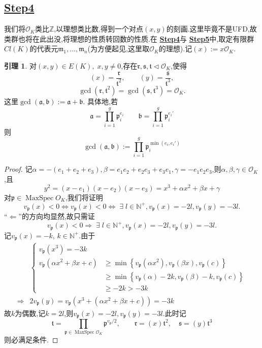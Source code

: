 \documentclass[12pt,A4paper,oneside,reqno]{amsart}
\numberwithin{equation}{section}
\theoremstyle{definition}
\newtheorem{lemma}[theorem]{引理}
\theoremstyle{plain}
\theoremstyle{plain}
\numberwithin{equation}{section}
\theoremstyle{remark}
\newcommand{\MaxSpec}{\operatorname{MaxSpec}}
\begin{document}
\subsection*{\underline{Step4}}
我们将$\mathcal{O}_K$类比$\mathbb{Z}$,以理想类比数,得到一个对点$(x,y)$的刻画.这里毕竟不是UFD,故类群也将在此出没,将理想的性质转回数的性质.在 \textbf{\underline{Step4}}与 \textbf{\underline{Step5}}中,取定有限群$Cl(K)$的代表元$\mathfrak{m}_1,\ldots , \mathfrak{m}_n$(为方便起见,这里取$\mathcal{O}_K$的理想).记$(x):=x \mathcal{O}_K$.
\begin{lemma}\label{lem:value2&3ideal}
	对$(x,y) \in E(K), \;x,y\neq 0$,存在$\mathfrak{r},\mathfrak{s},\mathfrak{t} \vartriangleleft \mathcal{O}_K$,使得
	$$(x)=\frac{\mathfrak{r}}{\mathfrak{t}^2}, \qquad (y)=\frac{\mathfrak{s}}{\mathfrak{t}^3}, $$
	$$\gcd(\mathfrak{r},\mathfrak{t}^2)=\gcd (\mathfrak{s},\mathfrak{t}^3)=\mathcal{O}_K.$$
	这里$\gcd(\mathfrak{a},\mathfrak{b}):=\mathfrak{a}+\mathfrak{b}$. 具体地,若
	$$\mathfrak{a}=\prod_{i=1}^{g}\mathfrak{p}_i^{e_i} \qquad \mathfrak{b}=\prod_{i=1}^{g}\mathfrak{p}_i^{e_i'}$$
	则$$\gcd(\mathfrak{a},\mathfrak{b}):=\prod_{i=1}^{g}\mathfrak{p}_i^{\min (e_i,e_i')}$$
\end{lemma}
\begin{proof}
	记$\alpha=-(e_1+e_2+e_3), \beta=e_1e_2+e_2e_3+e_3e_1, \gamma =-e_1e_2e_3$,则$\alpha,\beta,\gamma \in \mathcal{O}_K$,且
	$$y^2=(x-e_1)(x-e_2)(x-e_3)=x^3+\alpha x^2 +\beta x+ \gamma$$
	对$\mathfrak{p} \in \MaxSpec O_K$,我们将证明
	$$v_{\mathfrak{p}}(x)<0 \Longleftrightarrow v_{\mathfrak{p}}(x)<0 \Longleftrightarrow \;\exists \; l \in \mathbb{N}^+, v_{\mathfrak{p}}(x)=-2l, v_{\mathfrak{p}}(y)=-3l. $$	
	“$\Longleftarrow$”的方向均显然,故只需证
	$$v_{\mathfrak{p}}(x)<0 \Longrightarrow \;\exists \; l \in \mathbb{N}^+, v_{\mathfrak{p}}(x)=-2l, v_{\mathfrak{p}}(y)=-3l.$$
	记$v_{\mathfrak{p}}(x)=-k$, $k \in \mathbb{N}^+$.由于
	\begin{equation*}
	\begin{aligned}
	&\begin{cases}
	v_{\mathfrak{p}}(x^3)=-3k&\\
	v_{\mathfrak{p}}(\alpha x^2+\beta x+ c)&\geqslant \min \left\{v_{\mathfrak{p}}(\alpha x^2),v_{\mathfrak{p}}(\beta x),v_{\mathfrak{p}}(c)\right\}\\
	&\geqslant \min \left\{v_{\mathfrak{p}}(\alpha )-2k,v_{\mathfrak{p}}(\beta)-k,v_{\mathfrak{p}}(c)\right\}\\
	&\geqslant -2k>-3k
	\end{cases}\\
	\Longrightarrow & 2v_{\mathfrak{p}}(y)=v_{\mathfrak{p}}(x^3+(\alpha x^2+\beta x+ c))=-3k
	\end{aligned}
	\end{equation*}
	故$k$为偶数,记$k=2l$,则$v_{\mathfrak{p}}(x)=-2l,v_{\mathfrak{p}}(y)=-3l$.此时记
	$$\mathfrak{t}=\prod_{\mathfrak{p} \in \MaxSpec \mathcal{O}_K}\mathfrak{p}^{v_{\mathfrak{p}}/2},\qquad \mathfrak{r}=(x)\mathfrak{t}^2,\quad \mathfrak{s}=(y)\mathfrak{t}^3$$
	则必满足条件.
\end{proof}
\end{document}

